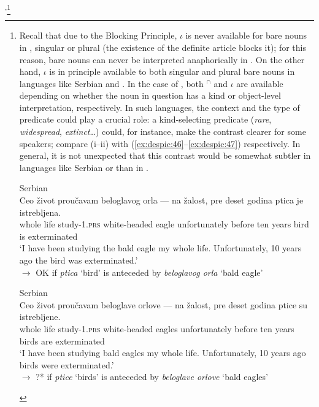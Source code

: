 \documentclass[output=paper,
modfonts
]{langscibook}
\begin{document}
{	}\textsuperscript{,}\footnote{Recall that due to the Blocking Principle, $\iota$ is never available for bare nouns in , singular or plural (the existence of the definite article blocks it); for this reason, bare nouns can never be interpreted anaphorically in . On the other hand, $\iota$ is in principle available to both singular and plural bare nouns in languages like Serbian and . In the case of , both $^\cap$ and $\iota$ are available depending on whether the noun in question has a kind or object-level interpretation, respectively. In such languages, the context and the type of predicate could play a crucial role: a kind-selecting predicate (\textit{rare}, \textit{widespread}, \textit{extinct}\ldots) could, for instance, make the contrast clearer for some speakers; compare (i--ii) with (\ref{ex:despic:46}--\ref{ex:despic:47}) respectively. In general, it is not unexpected that this contrast would be somewhat subtler in languages like Serbian or  than in .   
		\begin{exe}
		 \label{ex:despic:n11i}
		\textnormal{Serbian} \\
		\gll Ceo {\v zivot} {prou\v cavam}      beloglavog     orla  {---}   {na \v zalost},         pre     deset godina ptica je  istrebljena. 	 \\
		whole life    study-1.\textsc{prs} white-headed eagle  {}   unfortunately before ten     years  bird   is exterminated \\
		\glt `I have been studying the bald eagle my whole life. Unfortunately, 10 years ago the bird was exterminated.' \\
		$\rightarrow$ OK if \textit{ptica} `bird' is anteceded by \textit{beloglavog orla} `bald eagle'
		\end{exe}
		\begin{exe} 
		 \label{ex:despic:n11ii}
		\textnormal{Serbian} \\
		\gll    Ceo     {\v zivot} {prou\v cavam}     beloglave        orlove --- {na \v zalost},       pre      deset godina ptice  su   istrebljene. 	 \\
		whole life    study-1.\textsc{prs} white-headed eagles  {}    unfortunately before ten      years  birds  are exterminated \\
		\glt  `I have been studying bald eagles my whole life. Unfortunately, 10 years ago birds were exterminated.'  \\ 
		$\rightarrow$ ?* if \textit{ptice} `birds' is anteceded by \textit{beloglave orlove} `bald eagles' 
		\end{exe} 
	} 
	
\end{document}
